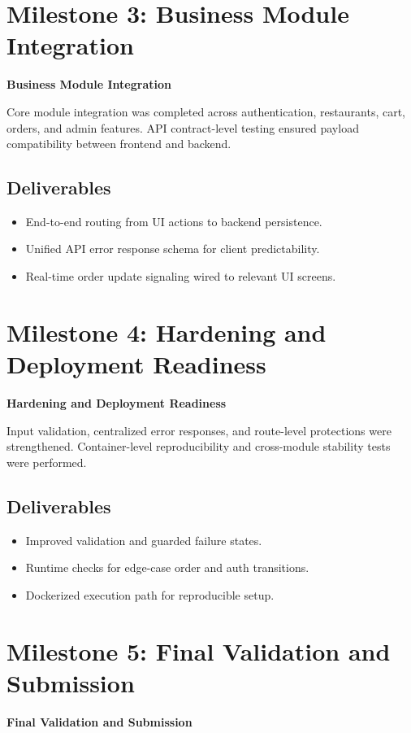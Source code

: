 \documentclass[12pt,a4paper]{report}
\begin{document}
\section{Milestone 3: Business Module Integration}
\textbf{Business Module Integration}

Core module integration was completed across authentication, restaurants, cart, orders, and admin features. API contract-level testing ensured payload compatibility between frontend and backend.

\subsection{Deliverables}
\begin{itemize}
    \item End-to-end routing from UI actions to backend persistence.
    \item Unified API error response schema for client predictability.
    \item Real-time order update signaling wired to relevant UI screens.
\end{itemize}

\section{Milestone 4: Hardening and Deployment Readiness}
\textbf{Hardening and Deployment Readiness}

Input validation, centralized error responses, and route-level protections were strengthened. Container-level reproducibility and cross-module stability tests were performed.

\subsection{Deliverables}
\begin{itemize}
    \item Improved validation and guarded failure states.
    \item Runtime checks for edge-case order and auth transitions.
    \item Dockerized execution path for reproducible setup.
\end{itemize}

\section{Milestone 5: Final Validation and Submission}
\textbf{Final Validation and Submission}
\end{document}

